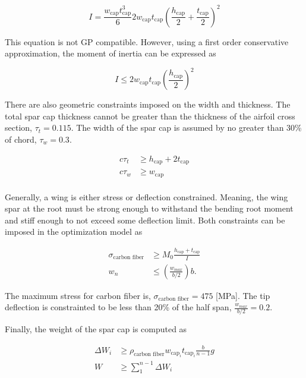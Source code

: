 \documentclass[]{aiaa-tc}%
\begin{document}
\begin{equation}
    \label{e:moispar}
    I = \frac{w_{\text{cap}}t_{\text{cap}}^3}{6} 2w_{\text{cap}}t_{\text{cap}}\left( \frac{h_{\text{cap}}}{2} + \frac{t_{\text{cap}}}{2} \right)^2
\end{equation}

This equation is not GP compatible.  However, using a first order conservative approximation, the moment of inertia can be expressed as

\begin{equation}
    \label{e:moispar}
    I \leq 2w_{\text{cap}}t_{\text{cap}}\left(\frac{h_{\text{cap}}}{2}\right)^2
\end{equation}

There are also geometric constraints imposed on the width and thickness.  The total spar cap thickness cannot be greater than the thickness of the airfoil cross section, $\tau_t = 0.115$.  The width of the spar cap is assumed by no greater than 30\% of chord, $\tau_w = 0.3$.

\begin{align}
    \label{e:thickness}
    c\tau_t &\geq h_{\text{cap}} + 2t_{\text{cap}} \\
    \label{e:width}
    c\tau_w &\geq w_{\text{cap}} \\
    \end{align}

Generally, a wing is either stress or deflection constrained. Meaning, the wing spar at the root must be strong enough to withstand the bending root moment and stiff enough to not exceed some deflection limit.  Both constraints can be imposed in the optimization model as

\begin{align}
    \label{e:stresscont}
    \sigma_{\text{carbon fiber}} &\geq M_0 \frac{h_{\text{cap}}+t_{\text{cap}}}{I}\\
    \label{e:defcont}
    w_n &\leq \left(\frac{w_{max}}{b/2} \right) b.
\end{align}

The maximum stress for carbon fiber is, $\sigma_{\text{carbon fiber}} = 475$ [MPa]. 
The tip deflection is constrainted to be less than 20\% of the half span, $\frac{w_{max}}{b/2} = 0.2$.

Finally, the weight of the spar cap is computed as

\begin{align}
    \label{e:sparmass}
    \Delta W_i &\geq \rho_{\text{carbon fiber}} w_{\text{cap}_i}t_{\text{cap}_i} \frac{b}{n-1}g \\
    \label{e:sparmasssum}
    W &\geq \sum\limits_{1}^{n-1} \Delta W_i
\end{align}
\end{document}
